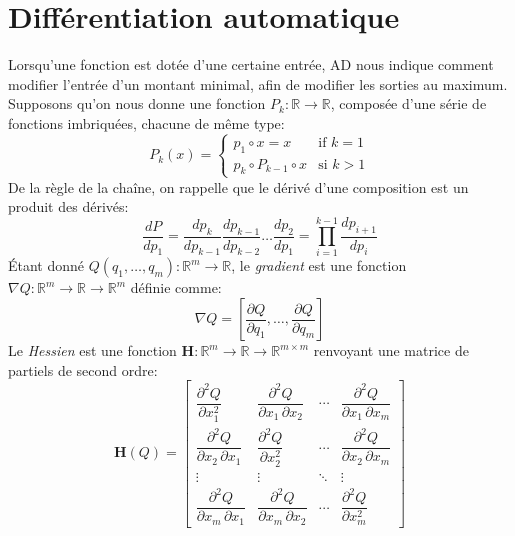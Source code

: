 \section{Différentiation automatique}\label{sec:automatic-differentiation}

Lorsqu'une fonction est dotée d'une certaine entrée, AD nous indique comment modifier l'entrée d'un montant minimal, afin de modifier les sorties au maximum. Supposons qu'on nous donne une fonction $P_k : \mathbb{R}\rightarrow\mathbb{R}$, composée d'une série de fonctions imbriquées, chacune de même type:
%
\begin{equation}
    P_k(x) = \begin{cases} p_1 \circ x = x &\text{if } k=1\\ p_k\circ P_{k-1} \circ x&\text{si } k > 1 \end{cases}
\end{equation}
%
De la règle de la chaîne, on rappelle que le dérivé d'une composition est un produit des dérivés:
%
\begin{equation} \label{eq:sfun_chain_rule}
\frac{dP}{dp_1} = \frac{dp_k}{dp_{k-1}}\frac{dp_{k-1}}{dp_{k-2}}\dots\frac{dp_2}{dp_1}= {\displaystyle \prod_{i=1}^{k-1} \frac{dp_{i+1}}{dp_{i}}}
\end{equation}
%
Étant donné $Q(q_1, \dots, q_m) : \mathbb{R}^m\rightarrow\mathbb{R}$, le \textit{gradient} est une fonction $\nabla Q : \mathbb{R}^m\rightarrow\mathbb{R}\rightarrow\mathbb{R}^m$ définie comme:
%
\begin{equation}
    \nabla Q = \left[ \frac{\partial Q}{\partial q_1}, \dots, \frac{\partial Q}{\partial q_m}\right]
\end{equation}
%
Le \textit{Hessien} est une fonction $\mathbf{H}:\mathbb{R}^m\rightarrow\mathbb{R}\rightarrow\mathbb{R}^{m\times m}$ renvoyant une matrice de partiels de second ordre:
%
\begin{equation}
    \mathbf{H}(Q) = \begin{bmatrix}{\dfrac {\partial ^{2}Q}{\partial x_{1}^{2}}}&{\dfrac {\partial ^{2}Q}{\partial x_{1}\,\partial x_{2}}}&\cdots &{\dfrac {\partial ^{2}Q}{\partial x_{1}\,\partial x_{m}}}\\[2.2ex]{\dfrac {\partial ^{2}Q}{\partial x_{2}\,\partial x_{1}}}&{\dfrac {\partial ^{2}Q}{\partial x_{2}^{2}}}&\cdots &{\dfrac {\partial ^{2}Q}{\partial x_{2}\,\partial x_{m}}}\\[2.2ex]\vdots &\vdots &\ddots &\vdots \\[2.2ex]{\dfrac {\partial ^{2}Q}{\partial x_{m}\,\partial x_{1}}}&{\dfrac {\partial ^{2}Q}{\partial x_{m}\,\partial x_{2}}}&\cdots &{\dfrac {\partial ^{2}Q}{\partial x_{m}^{2}}}\end{bmatrix}
\end{equation}
